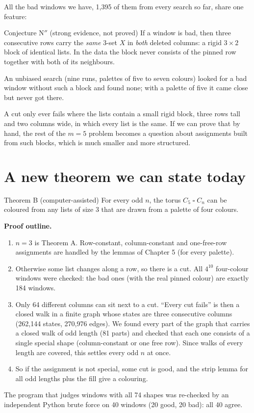 \documentclass[11pt,oneside,openany]{book}
\newcommand{\T}{\mathbin{\square}}
\begin{document}
All the bad windows we have, 1,395 of them from every search so far, share one feature:

\begin{partialbox}{Conjecture N$''$ (strong evidence, not proved)}
If a window is bad, then three consecutive rows carry the \emph{same} 3-set $X$ in \emph{both}
deleted columns: a rigid $3 \times 2$ block of identical lists. In the data the block never
consists of the pinned row together with both of its neighbours.
\end{partialbox}

An unbiased search (nine runs, palettes of five to seven colours) looked for a bad window without
such a block and found none; with a palette of five it came close but never got there.

\begin{plainwords}
A cut only ever fails where the lists contain a small rigid block, three rows tall and two columns
wide, in which every list is the same. If we can prove that by hand, the rest of the $m=5$
problem becomes a question about assignments built from such blocks, which is much smaller and
more structured.
\end{plainwords}

\section{A new theorem we can state today}

\begin{proved}{Theorem B (computer-assisted)}
For every odd $n$, the torus $C_5 \T C_n$ can be coloured from any lists of size 3 that are drawn
from a palette of four colours.
\end{proved}

\textbf{Proof outline.}
\begin{enumerate}[itemsep=0.2em]
\item $n=3$ is Theorem A. Row-constant, column-constant and one-free-row assignments are handled by
the lemmas of Chapter 5 (for every palette).
\item Otherwise some list changes along a row, so there is a cut. All $4^{10}$ four-colour windows
were checked: the bad ones (with the real pinned colour) are exactly 184 windows.
\item Only 64 different columns can sit next to a cut. ``Every cut fails'' is then a closed walk
in a finite graph whose states are three consecutive columns (262,144 states, 270,976 edges). We
found every part of the graph that carries a closed walk of odd length (81 parts) and checked that
each one consists of a single special shape (column-constant or one free row). Since walks of every
length are covered, this settles every odd $n$ at once.
\item So if the assignment is not special, some cut is good, and the strip lemma for all odd lengths
plus the fill give a colouring.
\end{enumerate}
The program that judges windows with all 74 shapes was re-checked by an independent Python brute
force on 40 windows (20 good, 20 bad): all 40 agree.
\end{document}

